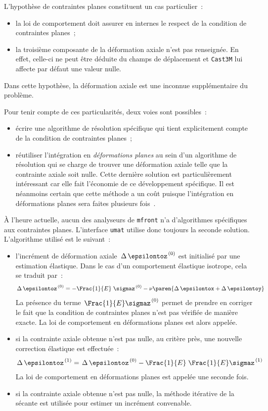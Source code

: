\documentclass[rectoverso,pleiades,pstricks,leqno,anti]{texmf/note_technique_2010}
\newcommand{\mfront}{\texttt{mfront}}
\newcommand{\castem}{\texttt{Cast3M}}
\newcommand{\umat}{\texttt{umat}}
\begin{document}
L'hypothèse de contraintes planes constituent un cas
particulier~:
\begin{itemize}
  \item la loi de comportement doit assurer en internes le
  respect de la condition de contraintes planes~;
  \item la troisième composante de la déformation axiale n'est
  pas renseignée. En effet, celle-ci ne peut être déduite du champs de
  déplacement et \castem{} lui affecte par défaut une valeur nulle.
\end{itemize}

Dans cette hypothèse, la déformation axiale est une inconnue
supplémentaire du problème.

Pour tenir compte de ces particularités, deux voies sont possibles~:
\begin{itemize}
  \item écrire une algorithme de résolution spécifique qui tient
  explicitement compte de la condition de contraintes planes~;
  \item réutiliser l'intégration en {\em déformations planes} au
  sein d'un algorithme de résolution qui se charge de trouver une
  déformation axiale telle que la contrainte axiale soit nulle. Cette
  dernière solution est particulièrement intéressant car elle fait
  l'économie de ce développement spécifique. Il est néanmoins certain
  que cette méthode a un coût puisque l'intégration en déformations
  planes sera faites plusieurs fois~\cite{proix:contraintes_planes}.
\end{itemize}

À l'heure actuelle, aucun des analyseurs de \mfront{} n'a d'algorithmes
spécifiques aux contraintes planes. L'interface \umat{} utilise donc
toujours la seconde solution. L'algorithme utilisé est le suivant~:
\begin{itemize}
  \item l'incrément de déformation axiale
  \(\left.\Delta\,\epsilontoz\right.^{(0)}\) est initialisé par une
  estimation élastique. Dans le cas d'un comportement élastique
  isotrope, cela se traduit par~:
  \[
  \left.\Delta\,\epsilontoz\right.^{(0)}=-\Frac{1}{E}\left.\sigmaz\right.^{(0)}-\nu\paren{\Delta\,\epsilontox+\Delta\,\epsilontoy}
  \]
  La présence du terme \(\left.\Frac{1}{E}\sigmaz\right.^{(0)}\)
  permet de prendre en corriger le fait que la condition de contraintes
  planes n'est pas vérifiée de manière exacte. La loi de comportement en
  déformations planes est alors appelée.
  \item si la contrainte axiale obtenue n'est pas nulle, au
  critère près, une nouvelle correction élastique est effectuée~:
  \[
  \left.\Delta\,\epsilontoz\right.^{(1)}=\left.\Delta\,\epsilontoz\right.^{(0)}-\Frac{1}{E}\left.\Frac{1}{E}\sigmaz\right.^{(1)}
  \]
  La loi de comportement en déformations planes est appelée une
  seconde fois.
  \item si la contrainte axiale obtenue n'est pas nulle, la
  méthode itérative de la sécante est utilisée pour estimer un incrément
  convenable.
\end{itemize}
\end{document}

